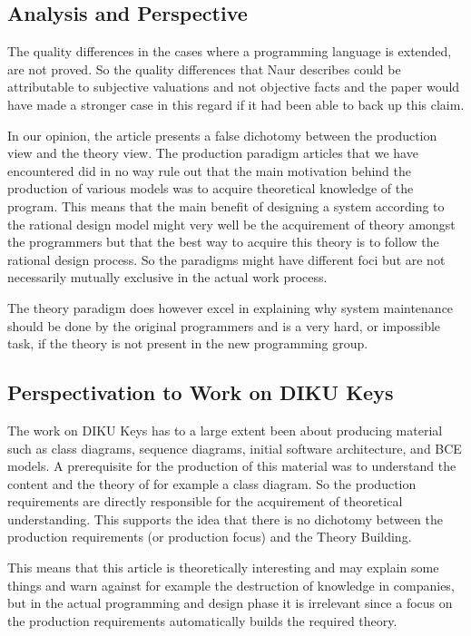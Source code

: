 \documentclass[11pt,a4paper]{report}
\begin{document}
\subsection{Analysis and Perspective}
The quality differences in the cases where a programming language is extended, are not proved. So the quality differences that Naur describes could be attributable to subjective valuations and not objective facts and the paper would have made a stronger case in this regard if it had been able to back up this claim.

In our opinion, the article presents a false dichotomy between the production view and the theory view. The production paradigm articles that we have encountered did in no way rule out that the main motivation behind the production of various models was to acquire theoretical knowledge of the program. This means that the main benefit of designing a system according to the rational design model\cite{art:parnas} might very well be the acquirement of theory amongst the programmers but that the best way to acquire this theory is to follow the rational design process. So the paradigms might have different foci but are not necessarily mutually exclusive in the actual work process.

The theory paradigm does however excel in explaining why system maintenance should be done by the original programmers and is a very hard, or impossible task, if the theory is not present in the new programming group.
\subsection{Perspectivation to Work on DIKU Keys}
The work on DIKU Keys has to a large extent been about producing material such as class diagrams, sequence diagrams, initial software architecture, and BCE models. A prerequisite for the production of this material was to understand the content and the theory of for example a class diagram. So the production requirements are directly responsible for the acquirement of theoretical understanding. This supports the idea that there is no dichotomy between the production requirements (or production focus) and the Theory Building.

This means that this article is theoretically interesting and may explain some things and warn against for example the destruction of knowledge in companies, but in the actual programming and design phase it is irrelevant since a focus on the production requirements automatically builds the required theory.
\end{document}
